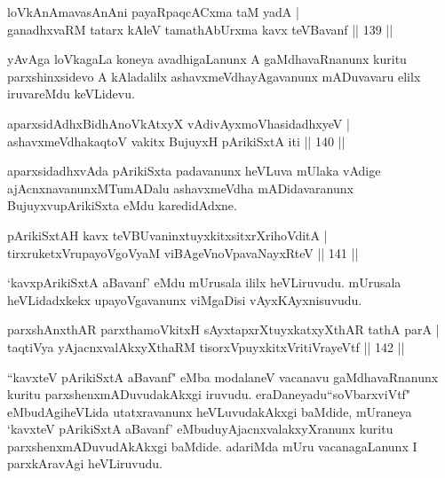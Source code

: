 \begin{shl}
loVkAnAmavasAnAni payaRpaqcACxma taM yadA |\\
ganadhxvaRM tatarx kAleV tamathAbUrxma kavx teV\s Bavanf \hfill || 139 ||
\end{shl}

\begin{artha}
yAvAga loVkagaLa koneya avadhigaLanunx A gaMdhavaRnanunx kuritu parxshinxsidevo A kAladalilx ashavxmeVdhayAgavanunx mADuvavaru elilx iruvareMdu keVLidevu.
\end{artha}

\begin{shl}
aparxsidAdhxBidhAnoVkAtxyX vAdivAyxmoVhasidadhxyeV |\\
ashavxmeVdhakaqtoV vakitx BujuyxH pArikiSxtA iti \hfill || 140 ||
\end{shl}

\begin{artha}
aparxsidadhxvAda pArikiSxta padavanunx heVLuva mUlaka vAdige ajAcnxnavanunxMTumADalu ashavxmeVdha mADidavaranunx Bujuyxvu\break pArikiSxta eMdu karedidAdxne.
\end{artha}


\begin{shl}
pArikiSxtAH kavx teV\s BUvaninxtuyxkitxsitxrXrihoVditA |\\
tirxruketxVrupayoVgoV\s yaM viBAgeVnoVpavaNayxRteV \hfill || 141 ||
\end{shl}

\begin{artha}
`kavxpArikiSxtA aBavanf' eMdu mUrusala ililx heVLiruvudu. mUrusala heVLidadxkekx upayoVgavanunx viMgaDisi vAyxKAyxnisuvudu.
\end{artha}

\begin{shl}
parxshAnxthAR parxthamoVkitxH sAyxtapxrXtuyxkatxyXthAR tathA parA |\\
taqtiVya yAjacnxvalAkxyXthaRM tisorxV\s puyxkitxVritiVrayeVtf \hfill || 142 ||
\end{shl}

\begin{artha}
``kavxteV pArikiSxtA aBavanf" eMba modalaneV vacanavu gaMdhavaRnanunx kuritu parxshenxmADuvudakAkxgi iruvudu. eraDaneyadu\break ``soV\s barxviVtf" eMbudAgiheVLida utatxravanunx heVLuvudakAkxgi baMdide, mUraneya `kavxteV pArikiSxtA aBavanf' eMbudu\break yAjacnxvalakxyXranunx kuritu parxshenxmADuvudAkAkxgi baMdide. adariMda mUru vacanagaLanunx I parxkAravAgi heVLiruvudu.
\end{artha}

